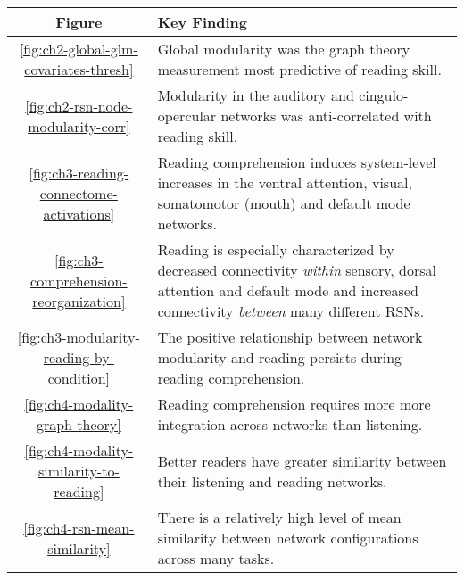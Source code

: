 \begin{tabular}{c|p{10cm}}
\toprule 
Figure & Key Finding \\ 
\midrule 
\ref{fig:ch2-global-glm-covariates-thresh} & Global modularity was the graph theory measurement most predictive of reading skill. \\ 
 \ref{fig:ch2-rsn-node-modularity-corr} & Modularity in the auditory and cingulo-opercular networks was anti-correlated with reading skill.	\\ 
\ref{fig:ch3-reading-connectome-activations} & Reading comprehension induces system-level increases in the ventral attention, visual, somatomotor (mouth) and default mode networks.	 \\ 
\ref{fig:ch3-comprehension-reorganization}  & Reading is especially characterized by decreased connectivity \textit{within} sensory, dorsal attention and default mode and increased connectivity \textit{between} many different RSNs.  \\ 
\ref{fig:ch3-modularity-reading-by-condition}  & The positive relationship between network modularity and reading persists during reading comprehension.  \\ 
\ref{fig:ch4-modality-graph-theory}  & Reading comprehension requires more more integration across networks than listening. \\ 
\ref{fig:ch4-modality-similarity-to-reading} & Better readers have greater similarity between their listening and reading networks.\\
\ref{fig:ch4-rsn-mean-similarity} & There is a relatively high level of mean similarity between network configurations across many tasks.\\
\bottomrule 
\end{tabular}